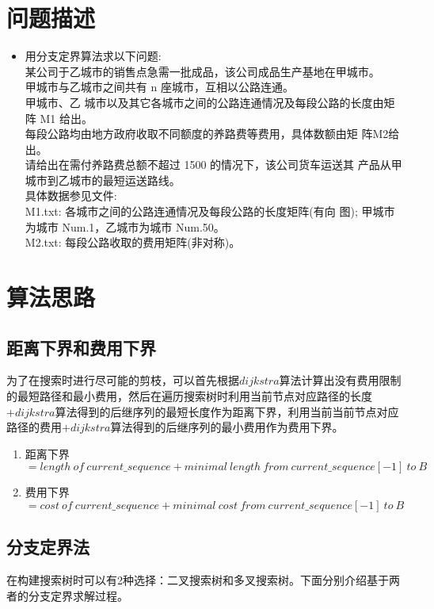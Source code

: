 \documentclass{article}
\begin{document}
	\section{问题描述}
	\begin{itemize}
		\item 用分支定界算法求以下问题:\\
		某公司于乙城市的销售点急需一批成品，该公司成品生产基地在甲城市。\\
		甲城市与乙城市之间共有 n 座城市，互相以公路连通。\\
		甲城市、乙 城市以及其它各城市之间的公路连通情况及每段公路的长度由矩阵 M1 给出。\\
		每段公路均由地方政府收取不同额度的养路费等费用，具体数额由矩 阵M2给出。\\
		请给出在需付养路费总额不超过 1500 的情况下，该公司货车运送其 产品从甲城市到乙城市的最短运送路线。\\
		具体数据参见文件:\\
		M1.txt: 各城市之间的公路连通情况及每段公路的长度矩阵(有向 图); 甲城市为城市 Num.1，乙城市为城市 Num.50。\\
		M2.txt: 每段公路收取的费用矩阵(非对称)。
	\end{itemize}
	
	
	\section{算法思路}
		\subsection{距离下界和费用下界}
			为了在搜索时进行尽可能的剪枝，可以首先根据$dijkstra$算法计算出没有费用限制的最短路径和最小费用，然后在遍历搜索树时利用当前节点对应路径的长度$+dijkstra$算法得到的后继序列的最短长度作为距离下界，利用当前当前节点对应路径的费用$+dijkstra$算法得到的后继序列的最小费用作为费用下界。
	\begin{enumerate}
		\item 距离下界$= length\ of\ current\_sequence+minimal\ length\ from\ current\_sequence[-1]\ to\ B$
		\item 费用下界$= cost\ of\ current\_sequence+minimal\ cost\ from\ current\_sequence[-1]\ to\ B$
	\end{enumerate}
	\subsection{分支定界法}
		在构建搜索树时可以有2种选择：二叉搜索树和多叉搜索树。下面分别介绍基于两者的分支定界求解过程。
\end{document}
